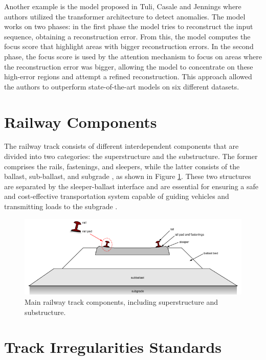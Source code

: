 Another example is the model proposed in Tuli, Casale and Jennings \cite{tuli2022tranaddeeptransformernetworks} where authors utilized the transformer architecture to detect anomalies. The model works on two phases: in the first phase the model tries to reconstruct the input sequence, obtaining a reconstruction error. From this, the model computes the focus score that highlight areas with bigger reconstruction errors. In the second phase, the focus score is used by the attention mechanism to focus on areas where the reconstruction error was bigger, allowing the model to concentrate on these high-error regions and attempt a refined reconstruction. This approach allowed the authors to outperform state-of-the-art models on six different datasets.

\section{Railway Components}

The railway track consists of different interdependent components that are divided into two categories: the superstructure and the substructure. The former comprises the rails, fastenings, and sleepers, while the latter consists of the ballast, sub-ballast, and subgrade \cite{kaewunruen12008dynamic}, as shown in Figure \ref{fig:Track-Components}. These two structures are separated by the sleeper-ballast interface and are essential for ensuring a safe and cost-effective transportation system capable of guiding vehicles and transmitting loads to the subgrade \cite{attoh2017big}.

\begin{figure}[H]
    \centering
    \includegraphics[width=12cm]{Cap2_LitReview/Track Components/track_components.png}
    \caption{Main railway track components, including superstructure and substructure. \cite{kaewunruen12008dynamic}}
    \label{fig:Track-Components}
\end{figure}

\section{Track Irregularities Standards} \label{sec-track-defects}

